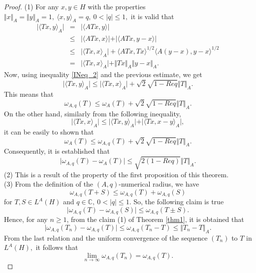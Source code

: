 \documentclass[preprint,12pt,3p]{elsarticle}
\begin{document}
\begin{proof}
   (1) For any $ x,y\in H $ with the properties $ \Vert x \Vert_{A}=\Vert y \Vert_{A}=1, \  \langle x,y \rangle_{A}=q, \ 0<\vert q \vert \leq 1, $ it is valid that
\begin{eqnarray}
\vert \langle Tx,y \rangle_{A}\vert & = & \vert \langle ATx,y \rangle \vert \nonumber \\
& \leq & \vert \langle ATx,x \rangle \vert + \vert \langle ATx,y-x \rangle \vert \nonumber \\
& \leq & \vert \langle Tx,x \rangle_{A} \vert + \langle ATx,Tx \rangle^{1/2}\langle A(y-x),y-x \rangle^{1/2} \nonumber \\
& = & \vert \langle Tx,x \rangle_{A} \vert + \Vert Tx \Vert_{A} \Vert y-x \Vert_{A}. \nonumber
\end{eqnarray}
Now, using inequality \eqref{INeq_2} and the previous estimate, we get
$$
\vert \langle Tx,y \rangle_{A}\vert \leq \vert \langle Tx,x \rangle_{A}\vert + \sqrt{2}\sqrt{1-Req} \Vert T \Vert_{A}.
$$
This means that 
$$
\omega_{A,q}(T)\leq \omega_{A}(T)+ \sqrt{2}\sqrt{1-Req} \Vert T \Vert_{A}. 
$$
On the other hand, similarly from the following inequality,
$$
\vert \langle Tx,x \rangle_{A} \vert \leq \vert \langle Tx,y \rangle_{A} \vert + \vert \langle Tx,x-y \rangle_{A} \vert,
$$
it can be easily to shown that
$$
\omega_{A}(T)\leq \omega_{A,q}(T)+ \sqrt{2}\sqrt{1-Req} \Vert T \Vert_{A}. 
$$
Consequently, it is established that 
$$ 
\vert \omega_{A,q}(T)-\omega_{A}(T)\vert\leq \sqrt{2(1-Req)}\Vert T \Vert_{A}.
$$
(2) This is a result of the property of the first proposition of this theorem. \\
(3) From the definition of the $ (A,q) $-numerical radius, we have
$$
\omega _{A,q}(T+S)\leq \omega _{A,q}(T)+ \omega _{A,q}(S)
$$
for $ T,S \in L^{A}(H) $ and $ q\in \mathbb{C}, \ 0< \vert q \vert \leq 1. $ So, the following claim is true
$$
\vert \omega _{A,q}(T)-\omega _{A,q}(S) \vert \leq \omega _{A,q}(T\pm S).
$$
Hence, for any $ n\geq 1 $, from the claim (1) of Theorem \ref{thm1}, it is obtained that 
$$
\vert \omega _{A,q}(T_{n})-\omega _{A,q}(T) \vert \leq \omega _{A,q}(T_{n}-T)\leq \Vert T_{n}-T \Vert_{A}.
$$
From the last relation and the uniform convergence of the sequence $ (T_{n}) $ to $ T $ in $ L^{A}(H), $ it follows that 
$$
\lim\limits_{n\rightarrow \infty}\omega_{A,q}(T_{n})=\omega_{A,q}(T).
$$
\end{proof}
\end{document}
